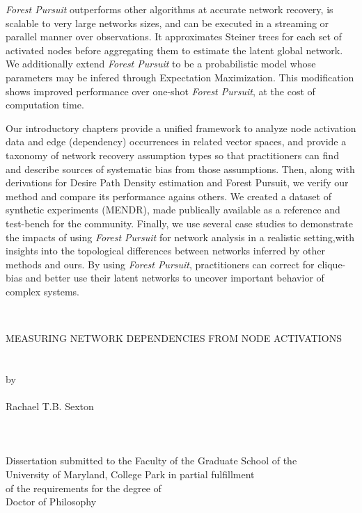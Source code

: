 \documentclass[%
	12pt,
		oneside,
		letterpaper
]{book}
\begin{document}
\emph{Forest Pursuit} outperforms other algorithms at accurate network
recovery, is scalable to very large networks sizes, and can be executed
in a streaming or parallel manner over observations. It approximates
Steiner trees for each set of activated nodes before aggregating them to
estimate the latent global network. We additionally extend \emph{Forest
Pursuit} to be a probabilistic model whose parameters may be infered
through Expectation Maximization. This modification shows improved
performance over one-shot \emph{Forest Pursuit}, at the cost of
computation time.

Our introductory chapters provide a unified framework to analyze node
activation data and edge (dependency) occurrences in related vector
spaces, and provide a taxonomy of network recovery assumption types so
that practitioners can find and describe sources of systematic bias from
those assumptions. Then, along with derivations for Desire Path Density
estimation and Forest Pursuit, we verify our method and compare its
performance agains others. We created a dataset of synthetic experiments
(MENDR), made publically available as a reference and test-bench for the
community. Finally, we use several case studies to demonstrate the
impacts of using \emph{Forest Pursuit} for network analysis in a
realistic setting,with insights into the topological differences between
networks inferred by other methods and ours. By using \emph{Forest
Pursuit}, practitioners can correct for clique-bias and better use their
latent networks to uncover important behavior of complex systems.\par
\clearpage%

\thispagestyle{empty} \hbox{\ } \vspace{1.5in}
\singlespacing
\small\normalsize
\begin{center}

\large{\uppercase{Measuring Network Dependencies from Node
Activations}}\\
\ \\ 
\ \\
\large{by} \\
\ \\
\large{Rachael T.B. Sexton}
\ \\
\ \\
\ \\
\ \\
\normalsize
Dissertation submitted to the Faculty of the Graduate School of the \\
University of Maryland, College Park in partial fulfillment \\
of the requirements for the degree of \\
Doctor of Philosophy \\

\end{center}
\end{document}
